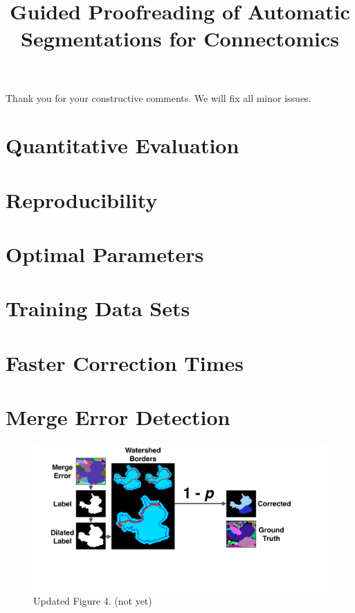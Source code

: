 \documentclass[10pt,twocolumn,letterpaper]{article}
\begin{document}
\title{Guided Proofreading of Automatic Segmentations for Connectomics}  %

\maketitle
\thispagestyle{empty}

Thank you for your constructive comments. We will fix all minor issues.

\section{Quantitative Evaluation}



\section{Reproducibility}



\section{Optimal Parameters}



\section{Training Data Sets}



\section{Faster Correction Times}



\section{Merge Error Detection}

\begin{figure}[h]
\centering
\includegraphics[width=\linewidth]{gfx/merge_error_v4.pdf}
\caption{Updated Figure 4. (not yet)}
\label{fig:merge_error}
\end{figure}


\section{}


{\small


}
\end{document}
